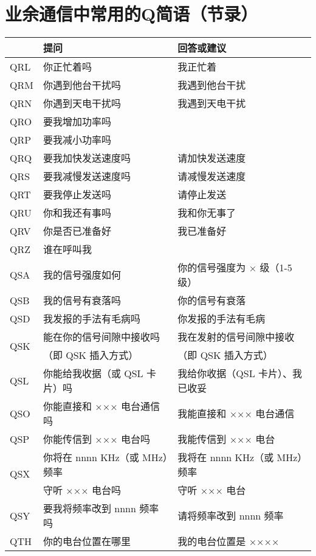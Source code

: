 \newpage

\section{业余通信中常用的Q简语（节录）}

\begin{tabular}{|l|l|l|}
	\hline
	    & \textbf{提问} & \textbf{回答或建议} \\
	\hline
	QRL & 你正忙着吗 & 我正忙着 \\
	\hline
	QRM & 你遇到他台干扰吗 & 我遇到他台干扰 \\
	\hline
	QRN & 你遇到天电干扰吗 & 我遇到天电干扰 \\
	\hline
	QRO & 要我增加功率吗 & \\
	\hline
	QRP & 要我减小功率吗 & \\
	\hline
	QRQ & 要我加快发送速度吗 & 请加快发送速度 \\
	\hline
	QRS & 要我减慢发送速度吗 & 请减慢发送速度 \\
	\hline
	QRT & 要我停止发送吗 & 请停止发送 \\
	\hline
	QRU & 你和我还有事吗 & 我和你无事了 \\
	\hline
	QRV & 你是否已准备好 & 我已准备好 \\
	\hline
	QRZ & 谁在呼叫我 & \\
	\hline
	QSA & 我的信号强度如何 & 你的信号强度为 × 级（1-5 级） \\
	\hline
	QSB & 我的信号有衰落吗 & 你的信号有衰落 \\
	\hline
	QSD & 我发报的手法有毛病吗 & 你发报的手法有毛病 \\
	\hline
	\multirow{2}{1em}{QSK} & 能在你的信号间隙中接收吗 & 我在发射的信号间隙中接收 \\
	& （即 QSK 插入方式）    & （即 QSK 插入方式） \\
	\hline
	QSL & 你能给我收据（或 QSL 卡片）吗 & 我给你收据（QSL 卡片）、我已收妥 \\
	\hline
	QSO & 你能直接和 ××× 电台通信吗 & 我能直接和 ××× 电台通信 \\
	\hline
	QSP & 你能传信到 ××× 电台吗 & 我能传信到 ××× 电台 \\
	\hline
	\multirow{2}{1em}{QSX} & 你将在 nnnn KHz（或 MHz）频率 & 我将在 nnnn KHz（或 MHz）频率 \\
	    & 守听 ××× 电台吗 & 守听 ××× 电台 \\
	\hline
	QSY & 要我将频率改到 nnnn 频率吗 & 请将频率改到 nnnn 频率 \\
	\hline
	QTH & 你的电台位置在哪里 & 我的电台位置是 ×××× \\
	\hline
\end{tabular}

